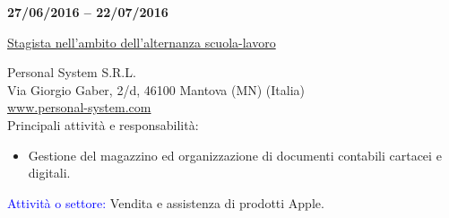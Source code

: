 \begin{minipage}[t]{0.3\textwidth}
	\textbf{27/06/2016 – 22/07/2016}
\end{minipage}%
\hfill
\hfill
\begin{minipage}[t]{0.6\textwidth}		
	\begin{Large}
		\underline{Stagista nell'ambito dell'alternanza scuola-lavoro} \vspace{1mm}\\
	\end{Large} 
	Personal System S.R.L. \\
	Via Giorgio Gaber, 2/d, 46100 Mantova (MN) (Italia)  \\
	\url{www.personal-system.com} \vspace{1mm}\\
	Principali attività e responsabilità:
	\begin{itemize}
		\item Gestione del magazzino ed organizzazione di documenti contabili cartacei e digitali.
	\end{itemize}

	\textcolor{blue}{Attività o settore:} Vendita e assistenza di prodotti Apple.
	\vspace{4mm}
\end{minipage}%